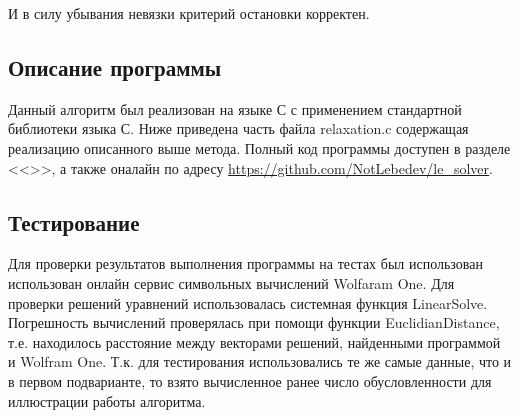 \documentclass[a4paper,12pt,titlepage,finall]{article}
\begin{document}
И в силу убывания невязки критерий остановки корректен.
\subsection{Описание программы}
Данный алгоритм был реализован на языке С с применением стандартной библиотеки языка С. Ниже приведена часть файла relaxation.c содержащая реализацию описанного выше метода. Полный код программы доступен в разделе <<>>, а также оналайн по адресу \url{https://github.com/NotLebedev/le_solver}.


\subsection{Тестирование}
Для проверки результатов выполнения программы на тестах был использован использован онлайн сервис символьных вычислений Wolfaram One. Для проверки решений уравнений использовалась системная функция {\ttfamily LinearSolve}. Погрешность вычислений проверялась при помощи функции {\ttfamily EuclidianDistance}, т.е. находилось расстояние между векторами решений, найденными программой и Wolfram One. Т.к. для тестирования использовались те же самые данные, что и в первом подварианте, то взято вычисленное ранее число обусловленности для иллюстрации работы алгоритма.
\end{document}
